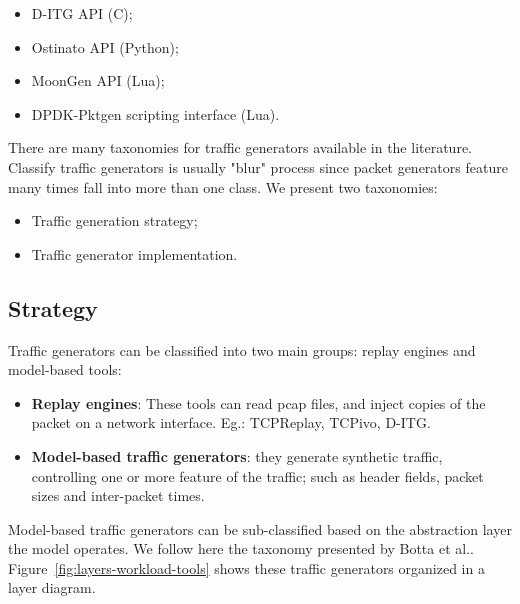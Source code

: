 \begin{itemize}
\item D-ITG API (C)\cite{web-ditg};
\item Ostinato API (Python)\cite{web-ostinato};
\item MoonGen API (Lua)\cite{web-moongen};
\item DPDK-Pktgen scripting interface (Lua)\cite{web-dpdk-pktgen}.
\end{itemize}

There are many taxonomies for traffic generators available in the literature. Classify traffic generators is usually "blur" process since packet generators feature many times fall into more than one class. We present two taxonomies:

\begin{itemize}
\item Traffic generation strategy;
\item Traffic generator implementation.
\end{itemize}

\subsection{Strategy}


Traffic generators can be classified into two main groups: replay engines\cite{sourcesonoff-paper} and model-based tools:

\begin{itemize}
\item \textbf{Replay engines}: These tools can read pcap files, and inject copies of the packet on a network interface. Eg.: TCPReplay\cite{web-tcpreplay}, TCPivo\cite{tcpivo-paper}, D-ITG\cite{ditg-paper}.
\item \textbf{Model-based traffic generators}: they generate synthetic traffic, controlling one or more feature of the traffic; such as header fields, packet sizes and inter-packet times.  
\end{itemize}

Model-based traffic generators can be sub-classified based on the abstraction layer the model operates. We follow here the taxonomy presented by Botta et al.\cite{do-you-trust}. Figure~\ref{fig:layers-workload-tools} shows these traffic generators organized in a layer diagram.

